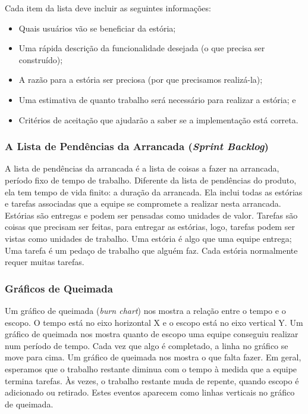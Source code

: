 \documentclass[
	11pt,				%
	openright,
	twoside,			%
	a4paper,			%
	english,			%
	french,
	brazil,				%
	sumario=tradicional
	]{abntex2}
\begin{document}
Cada item da lista deve incluir as seguintes informações:
\begin{itemize}
\item Quais usuários vão se beneficiar da estória;
\item Uma rápida descrição da funcionalidade desejada (o que precisa ser construído);
\item A razão para a estória ser preciosa (por que precisamos realizá-la);
\item Uma estimativa de quanto trabalho será necessário para realizar a estória; e
\item Critérios de aceitação que ajudarão a saber se a implementação está correta.
\end{itemize}

\subsubsection{A Lista de Pendências da Arrancada (\emph{Sprint Backlog})}
A lista de pendências da arrancada é a lista de coisas a fazer na arrancada, período fixo de tempo de trabalho. Diferente da lista de pendências do produto, ela tem tempo de vida finito: a duração da arrancada. Ela inclui todas as estórias e tarefas associadas que a equipe se compromete a realizar nesta arrancada. Estórias são entregas e podem ser pensadas como unidades de valor. Tarefas são coisas que precisam ser feitas, para entregar as estórias, logo, tarefas podem ser vistas como unidades de trabalho. Uma estória é algo que uma equipe entrega; Uma tarefa é um pedaço de trabalho que alguém faz. Cada estória normalmente requer muitas tarefas.

\subsubsection{Gráficos de Queimada}
Um gráfico de queimada (\emph{burn chart}) nos mostra a relação entre o tempo e o escopo. O tempo está no eixo horizontal X e o escopo está no eixo vertical Y. Um gráfico de queimada nos mostra quanto de escopo uma equipe conseguiu realizar num período de tempo. Cada vez que algo é completado, a linha no gráfico se move para cima. Um gráfico de queimada nos mostra o que falta fazer. Em geral, esperamos que o trabalho restante diminua com o tempo à medida que a equipe termina tarefas. Às vezes, o trabalho restante muda de repente, quando escopo é adicionado ou retirado. Estes eventos aparecem como linhas verticais no gráfico de queimada.
\end{document}
